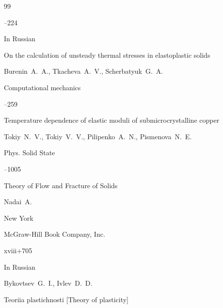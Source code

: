 \begin{thebibliography}{99}

--224




\lang In Russian

\paper On the calculation of unsteady thermal stresses in elastoplastic solids 

\by Burenin~A.~A., Tkacheva~A.~V., Scherbatyuk~G.~A.

\jour Computational mechanics




--259







\paper Temperature dependence of elastic moduli of submicrocrystalline copper

\by Tokiy~N.~V., Tokiy~V.~V., Pilipenko~A.~N., Pismenova~N.~E.



\jour Phys. Solid State




--1005






\book Theory of Flow and Fracture of Solids 


\by  Nadai~A.

\publaddr New York

\publ McGraw-Hill Book Company, Inc.


\totalpages  xviii+705






\lang In Russian

\by Bykovtsev~G.~I., Ivlev~D.~D. 

\book Teoriia plastichnosti \rm [Theory of plasticity]


\end{thebibliography}
